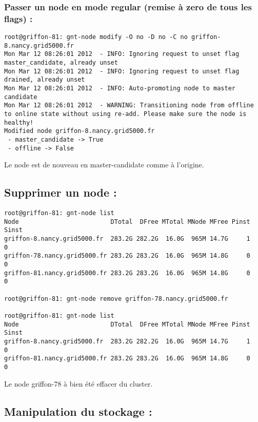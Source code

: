 \subsubsection {Passer un node en mode regular (remise à zero de tous les flags) :}
\begin{lstlisting}
root@griffon-81: gnt-node modify -O no -D no -C no griffon-8.nancy.grid5000.fr
Mon Mar 12 08:26:01 2012  - INFO: Ignoring request to unset flag master_candidate, already unset
Mon Mar 12 08:26:01 2012  - INFO: Ignoring request to unset flag drained, already unset
Mon Mar 12 08:26:01 2012  - INFO: Auto-promoting node to master candidate
Mon Mar 12 08:26:01 2012  - WARNING: Transitioning node from offline to online state without using re-add. Please make sure the node is healthy!
Modified node griffon-8.nancy.grid5000.fr
 - master_candidate -> True
 - offline -> False
\end{lstlisting}
Le node est de nouveau en master-candidate comme à l'origine.

\subsection {Supprimer un node :}
\begin{lstlisting}
root@griffon-81: gnt-node list
Node                         DTotal  DFree MTotal MNode MFree Pinst Sinst
griffon-8.nancy.grid5000.fr  283.2G 282.2G  16.0G  965M 14.7G     1     0
griffon-78.nancy.grid5000.fr 283.2G 283.2G  16.0G  965M 14.8G     0     0
griffon-81.nancy.grid5000.fr 283.2G 283.2G  16.0G  965M 14.8G     0     0

root@griffon-81: gnt-node remove griffon-78.nancy.grid5000.fr

root@griffon-81: gnt-node list
Node                         DTotal  DFree MTotal MNode MFree Pinst Sinst
griffon-8.nancy.grid5000.fr  283.2G 282.2G  16.0G  965M 14.7G     1     0
griffon-81.nancy.grid5000.fr 283.2G 283.2G  16.0G  965M 14.8G     0     0
\end{lstlisting}
Le node griffon-78 à bien été effacer du cluster.

\subsection {Manipulation du stockage :}

